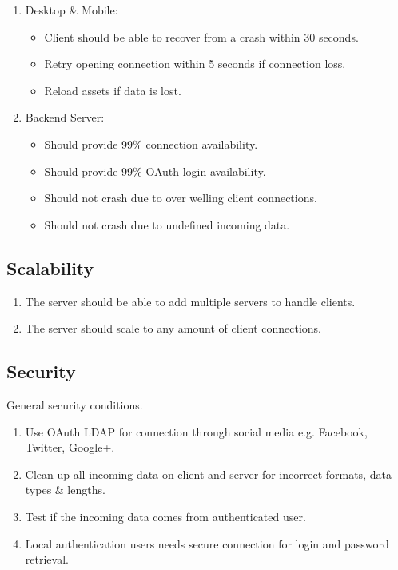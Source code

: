 \documentclass[letterpaper]{article}
\begin{document}
		\begin{enumerate}
			\item Desktop \& Mobile:
				\begin{itemize}
					\item Client should be able to recover from a crash within 30 seconds.
					\item Retry opening connection within 5 seconds if connection loss.
					\item Reload assets if data is lost.
				\end{itemize}
			\item Backend Server:
				\begin{itemize}
					\item Should provide 99\% connection availability.
					\item Should provide 99\% OAuth login availability.
					\item Should not crash due to over welling client connections.
					\item Should not crash due to undefined incoming data.
				\end{itemize}
		\end{enumerate}
		
		\subsection*{Scalability}
		\vspace{0.1in}
		
		\begin{enumerate}
			\item The server should be able to add multiple servers to handle clients.
			\item The server should scale to any amount of client connections.
		\end{enumerate}
		
		\subsection*{Security}
		\vspace{0.1in}
		
		General security conditions.
		\begin{enumerate}
			\item Use OAuth LDAP for connection through social media e.g. Facebook, Twitter, Google+.
			\item Clean up all incoming data on client and server for incorrect formats, data types \& lengths.
			\item Test if the incoming data comes from authenticated user.
			\item Local authentication users needs secure connection for login and password retrieval.
		\end{enumerate}
		
\end{document}
